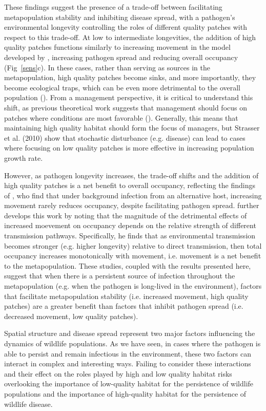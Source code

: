 \documentclass{svjour3}
\begin{document}
These findings suggest the presence of a trade-off between facilitating metapopulation stability and inhibiting disease spread, with a pathogen's environmental longevity controlling the roles of different quality patches with respect to this trade-off.  At low to intermediate longevities, the addition of high quality patches functions similarly to increasing movement in the model developed by \cite{Hess1996}, increasing pathogen spread and reducing overall occupancy (Fig~\ref{sens}c).  In these cases, rather than serving as sources in the metapopulation, high quality patches  become sinks, and more importantly, they become ecological traps, which can be even more detrimental to the overall population (\cite{Kristan2003}).  From a management perspective, it is critical to understand this shift, as previous theoretical work suggests that management should focus on patches where conditions are most favorable (\cite{Strasser2010}).  Generally, this means that maintaining high quality habitat should form the focus of managers, but Strasser et al. (2010) show that stochastic disturbance (e.g. disease) can lead to cases where focusing on low quality patches is more effective in increasing population growth rate.

However, as pathogen longevity increases, the trade-off shifts and the addition of high quality patches is a net benefit to overall occupancy, reflecting the findings of \cite{Gog2002}, who find that under background infection from an alternative host, increasing movement rarely reduces occupancy, despite facilitating pathogen spread.  \cite{Park2012} further develops this work by noting that the magnitude of the detrimental effects of increased moevement on occupancy depends on the relative strength of different transmission pathways.  Specifically, he finds that as environmental transmission becomes stronger (e.g. higher longevity) relative to direct transmission, then total occupancy increases monotonically with movement, i.e. movement is a net benefit to the metapopulation.  These studies, coupled with the results presented here, suggest that when there is a persistent source of infection throughout the metapopulation (e.g. when the pathogen is long-lived in the environment), factors that facilitate metapopulation stability (i.e. increased movement, high quality patches) are a greater benefit than factors that inhibit pathogen spread (i.e. decreased movement, low quality patches).  

Spatial structure and disease spread represent two major factors influencing the dynamics of wildlife populations.  As we have seen, in cases where the pathogen is able to persist and remain infectious in the environment, these two factors can interact in complex and interesting ways.  Failing to consider these interactions and their effect on the roles played by high and low quality habitat risks overlooking the importance of low-quality habitat for the persistence of wildlife populations and the importance of high-quality habitat for the persistence of wildlife disease.
\end{document}

